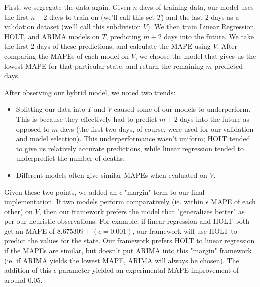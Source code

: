 \documentclass[sigconf,nonacm]{acmart}
\begin{document}
First, we segregate the data again. Given $n$ days of training data, our model
uses the first $n-2$ days to train on (we'll call this set $T$) and the last
$2$ days as a validation dataset (we'll call this subdivision $V$). We then
train Linear Regression, HOLT, and ARIMA models on $T$, predicting $m+2$ days
into the future. We take the first $2$ days of these predictions, and calculate
the MAPE using $V$. After comparing the MAPEs of each model on $V$, we choose
the model that gives us the lowest MAPE for that particular state, and return
the remaining $m$ predicted days. 

After observing our hybrid model, we noted two trends: 
\begin{itemize}
\item 
Splitting our data into $T$ and $V$ caused some of our models to
underperform. This is because they effectively had to predict $m+2$ days into
the future as opposed to $m$ days (the first two days, of course, were used for
our validation and model selection). This underperformance wasn't uniform;
HOLT tended to give us relatively accurate predictions, while linear regression
tended to underpredict the number of deaths. 
\item
Different models often give similar MAPEs when evaluated on $V$. 
\end{itemize}

Given these two points, we added an $\epsilon$ "margin" term to our final
implementation. If two models perform comparatively (ie. within $\epsilon$ MAPE
of each other) on $V$, then our framework prefers the model that "generalizes
better" as per our heuristic observations. For example, if linear regression
and HOLT both get an MAPE of $8.675309 \pm (\epsilon = 0.001)$, our framework
will use HOLT to predict the values for the state. Our framework prefers HOLT
to linear regression if the MAPEs are similar, but doesn't put ARIMA into this
"margin" framework (ie. if ARIMA yields the lowest MAPE, ARIMA will always be
chosen). The addition of this $\epsilon$ parameter yielded an experimental 
MAPE improvement of around 0.05. 



\end{document}
